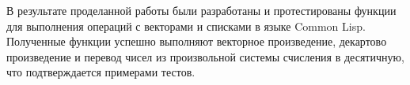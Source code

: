 

В результате проделанной работы были разработаны и протестированы функции для выполнения операций с векторами и списками в языке Common Lisp. Полученные функции успешно выполняют векторное произведение, декартово произведение и перевод чисел из произвольной системы счисления в десятичную, что подтверждается примерами тестов.
